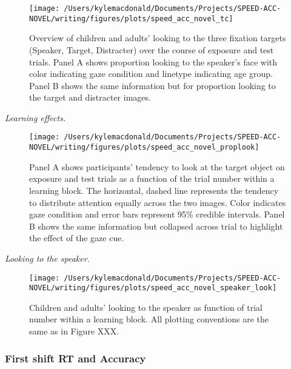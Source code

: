\documentclass[man,floatsintext]{apa6}
\begin{document}
\begin{figure}[!t]

{\centering \texttt{[image: /Users/kylemacdonald/Documents/Projects/SPEED-ACC-NOVEL/writing/figures/plots/speed\_acc\_novel\_tc]} 

}

\caption{Overview of children and adults' looking to the three fixation targets (Speaker, Target, Distracter) over the course of exposure and test trials. Panel A shows proportion looking to the speaker's face with color indicating gaze condition and linetype indicating age group. Panel B shows the same information but for proportion looking to the target and distracter images.}\label{fig:san-tc-plot}
\end{figure}

\emph{Learning effects.}

\begin{figure}[!t]

{\centering \texttt{[image: /Users/kylemacdonald/Documents/Projects/SPEED-ACC-NOVEL/writing/figures/plots/speed\_acc\_novel\_proplook]} 

}

\caption{Panel A shows participants’ tendency to look at the target object on exposure and test trials as a function of the trial number within a learning block. The horizontal, dashed line represents the tendency to distribute attention equally across the two images. Color indicates gaze condition and error bars represent 95\% credible intervals. Panel B shows the same information but collapsed across trial to highlight the effect of the gaze cue.}\label{fig:san-prop-looking-plot}
\end{figure}

\emph{Looking to the speaker.}

\begin{figure}[!t]

{\centering \texttt{[image: /Users/kylemacdonald/Documents/Projects/SPEED-ACC-NOVEL/writing/figures/plots/speed\_acc\_novel\_speaker\_look]} 

}

\caption{Children and adults' looking to the speaker as function of trial number within a learning block. All plotting conventions are the same as in Figure XXX.}\label{fig:san-prop-looking-speaker-plot}
\end{figure}

\subsubsection{First shift RT and
Accuracy}\label{first-shift-rt-and-accuracy}
\end{document}
